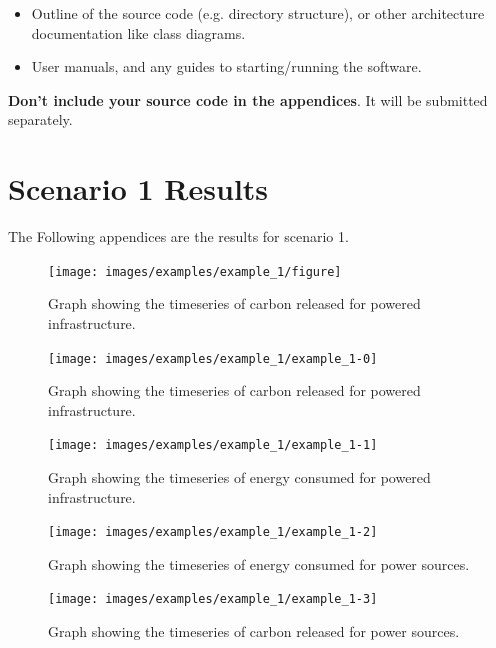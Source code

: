 \documentclass{l4proj}
\begin{document}
\begin{appendices}
\begin{itemize}
\item Outline of the source code (e.g. directory structure), or other architecture documentation like class diagrams.

\item User manuals, and any guides to starting/running the software.

\end{itemize}

\textbf{Don't include your source code in the appendices}. It will be
submitted separately.

\clearpage
\section{Scenario 1 Results}\label{apen:subsec:scen1}
The Following appendices are the results for scenario 1.
\clearpage
\begin{figure}[htbp]
    \centering
    \texttt{[image: images/examples/example\_1/figure]}
    ~
    \caption{Graph showing the timeseries of carbon released for powered infrastructure.}
    \label{fig:example2-0}
\end{figure}
\clearpage
\begin{figure}[htbp]
    \centering
    \texttt{[image: images/examples/example\_1/example\_1-0]}
    ~
    \caption{Graph showing the timeseries of carbon released for powered infrastructure.}
    \label{fig:example1-0}
\end{figure}
\clearpage
\begin{figure}[htbp]
    \centering
    \texttt{[image: images/examples/example\_1/example\_1-1]}
    ~
    \caption{Graph showing the timeseries of energy consumed for powered infrastructure.}
    \label{fig:example1-1}
\end{figure}
\clearpage
\begin{figure}[htbp]
    \centering
    \texttt{[image: images/examples/example\_1/example\_1-2]}
    ~
    \caption{Graph showing the timeseries of energy consumed for power sources.}
    \label{fig:example1-2}
\end{figure}
\clearpage
\begin{figure}[htbp]
    \centering
    \texttt{[image: images/examples/example\_1/example\_1-3]}
    ~
    \caption{Graph showing the timeseries of carbon released for power sources.}
    \label{fig:example1-3}
\end{figure}


\end{appendices}
\end{document}
